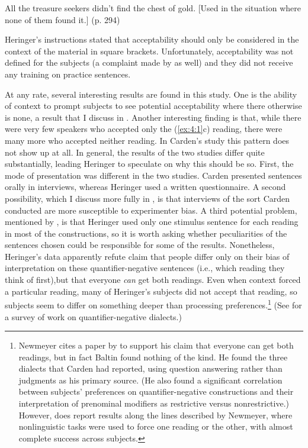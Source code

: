 \ea\label{ex:4:3}
      All the treasure seekers didn't find the chest of gold. [Used in the situation where none of them found it.] (p. 294)    
\z

\noindent
Heringer's instructions stated that acceptability should only be considered  in the context of the material in square brackets. Unfortunately, acceptability was not defined for the subjects (a complaint made by \citet{Carden1970a} as well) and they did not receive any training on practice sentences.

At any rate, several interesting results are found in this study. One is the ability of context to prompt subjects to see potential acceptability where there otherwise is none, a result that I discuss in . Another interesting finding is that, while there were very few speakers who accepted only the (\ref{ex:4:1}c) reading, there were many more who accepted neither reading. In Carden's study  this  pattern does not show up at all. In general, the results of the two studies differ quite substantially, leading Heringer to speculate on why this should be so. First, the mode of presentation was different in the two studies. Carden presented sentences orally in interviews, whereas Heringer used a written questionnaire. A second possibility, which I discuss more fully in , is that interviews of the sort Carden conducted are more susceptible to experimenter bias. A third potential problem, mentioned by \citet{Carden1970a}, is that Heringer used only one stimulus sentence for each reading in most of the constructions, so it is worth asking whether peculiarities of the sentences chosen could be responsible for some of the results. Nonetheless, Heringer's data apparently refute  claim that people differ only on their bias of interpretation on these quantifier-negative sentences (i.e., which reading they think of first),but that everyone \textit{can} get both readings. Even when context forced a particular reading, many of Heringer's subjects did not accept that reading, so subjects seem to differ on something deeper than processing preferences.\footnote{Newmeyer cites a paper by \citet{Baltin1977} to support his claim that everyone can get both readings, but in fact Baltin found nothing of the kind. He found the three dialects that Carden had reported, using question answering rather than judgments as his primary source. (He also found a significant correlation between subjects' preferences on quantifier-negative constructions and their interpretation of prenominal modifiers as restrictive versus nonrestrictive.) However, \citet{Labov1975}
does report results along the lines described by Newmeyer, where nonlinguistic tasks were used to force one reading or the other, with almost complete success across subjects.
}
 (See \citet{Labov1972a} for a survey of work on quantifier-negative dialects.)


